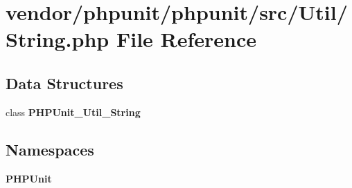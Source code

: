 \section{vendor/phpunit/phpunit/src/\+Util/\+String.php File Reference}
\label{phpunit_2phpunit_2src_2_util_2_string_8php}
\subsection*{Data Structures}
\begin{DoxyCompactItemize}
\item 
class {\bf P\+H\+P\+Unit\+\_\+\+Util\+\_\+\+String}
\end{DoxyCompactItemize}
\subsection*{Namespaces}
\begin{DoxyCompactItemize}
\item 
 {\bf P\+H\+P\+Unit}
\end{DoxyCompactItemize}
